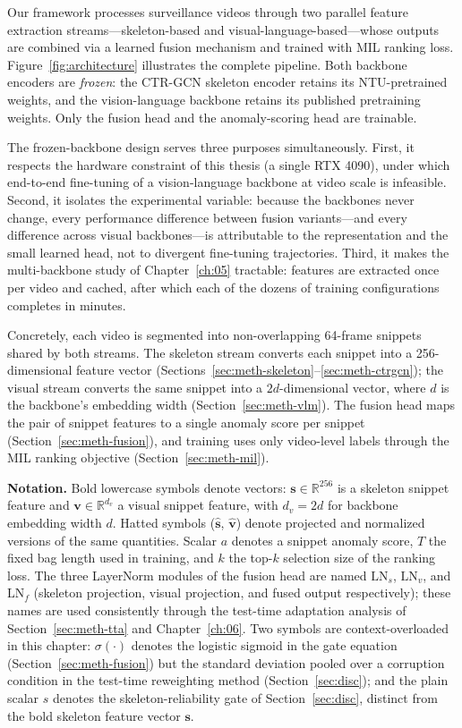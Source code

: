 Our framework processes surveillance videos through two parallel feature extraction
streams---skeleton-based and visual-language-based---whose outputs are combined via a learned
fusion mechanism and trained with MIL ranking loss. Figure~\ref{fig:architecture} illustrates the
complete pipeline. Both backbone encoders are \emph{frozen}: the CTR-GCN skeleton encoder retains
its NTU-pretrained weights, and the vision-language backbone retains its published pretraining
weights. Only the fusion head and the anomaly-scoring head are trainable.

The frozen-backbone design serves three purposes simultaneously. First, it respects the hardware
constraint of this thesis (a single RTX 4090), under which end-to-end fine-tuning of a
vision-language backbone at video scale is infeasible. Second, it isolates the experimental
variable: because the backbones never change, every performance difference between fusion
variants---and every difference across visual backbones---is attributable to the representation
and the small learned head, not to divergent fine-tuning trajectories. Third, it makes the
multi-backbone study of Chapter~\ref{ch:05} tractable: features are extracted once per video and
cached, after which each of the dozens of training configurations completes in minutes.

Concretely, each video is segmented into non-overlapping 64-frame snippets shared by both
streams. The skeleton stream converts each snippet into a 256-dimensional feature vector
(Sections~\ref{sec:meth-skeleton}--\ref{sec:meth-ctrgcn}); the visual stream converts the same
snippet into a $2d$-dimensional vector, where $d$ is the backbone's embedding width
(Section~\ref{sec:meth-vlm}). The fusion head maps the pair of snippet features to a single
anomaly score per snippet (Section~\ref{sec:meth-fusion}), and training uses only video-level
labels through the MIL ranking objective (Section~\ref{sec:meth-mil}).

\textbf{Notation.} Bold lowercase symbols denote vectors: $\mathbf{s} \in \mathbb{R}^{256}$ is a
skeleton snippet feature and $\mathbf{v} \in \mathbb{R}^{d_v}$ a visual snippet feature, with
$d_v = 2d$ for backbone embedding width $d$. Hatted symbols ($\hat{\mathbf{s}}$,
$\hat{\mathbf{v}}$) denote projected and normalized versions of the same quantities. Scalar $a$
denotes a snippet anomaly score, $T$ the fixed bag length used in training, and $k$ the top-$k$
selection size of the ranking loss. The three LayerNorm modules of the fusion head are named
$\text{LN}_s$, $\text{LN}_v$, and $\text{LN}_f$ (skeleton projection, visual projection, and
fused output respectively); these names are used consistently through the test-time adaptation
analysis of Section~\ref{sec:meth-tta} and Chapter~\ref{ch:06}. Two symbols are
context-overloaded in this chapter: $\sigma(\cdot)$ denotes the logistic sigmoid in the gate
equation (Section~\ref{sec:meth-fusion}) but the standard deviation pooled over a corruption
condition in the test-time reweighting method (Section~\ref{sec:disc}); and the plain scalar $s$
denotes the skeleton-reliability gate of Section~\ref{sec:disc}, distinct from the bold skeleton
feature vector $\mathbf{s}$.

